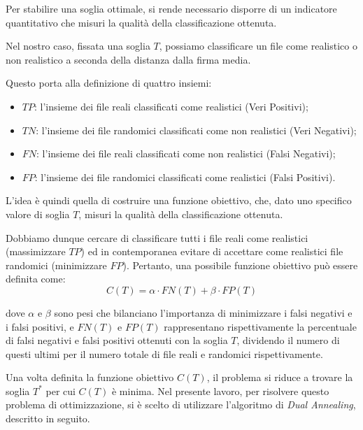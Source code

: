 \documentclass{report}
\begin{document}
\bigskip

Per stabilire una soglia ottimale, si rende necessario disporre di un indicatore quantitativo che misuri la qualità della classificazione ottenuta.

Nel nostro caso, fissata una soglia $T$, possiamo classificare un file come realistico o non realistico a seconda della distanza 
dalla firma media.

\bigskip

Questo porta alla definizione di quattro insiemi:
\begin{itemize}
    \item \(TP\): l’insieme dei file reali classificati come realistici (Veri Positivi);
    \item \(TN\): l’insieme dei file randomici classificati come non realistici (Veri Negativi);
    \item \(FN\): l’insieme dei file reali classificati come non realistici (Falsi Negativi);
    \item \(FP\): l’insieme dei file randomici classificati come realistici (Falsi Positivi).
\end{itemize}

\bigskip

L'idea è quindi quella di costruire una funzione obiettivo, che, dato uno specifico valore di soglia \(T\), misuri la qualità della classificazione ottenuta.

\bigskip

Dobbiamo dunque cercare di classificare tutti i file reali come realistici (massimizzare \(TP\)) ed in contemporanea evitare di accettare come realistici file randomici (minimizzare \(FP\)).
Pertanto, una possibile funzione obiettivo può essere definita come:
\[
C(T) = \alpha \cdot FN(T) + \beta \cdot FP(T)
\]

dove \(\alpha\) e \(\beta\) sono pesi che bilanciano l'importanza di minimizzare i falsi negativi e i falsi positivi,
e \(FN(T)\) e \(FP(T)\) rappresentano rispettivamente la percentuale di falsi negativi e falsi positivi ottenuti con la soglia \(T\), 
dividendo il numero di questi ultimi per il numero totale di file reali e randomici rispettivamente.

\bigskip

Una volta definita la funzione obiettivo \(C(T)\), il problema si riduce a trovare la soglia \(T^*\) per cui \(C(T)\) è minima.
Nel presente lavoro, per risolvere questo problema di ottimizzazione, si è scelto di utilizzare l'algoritmo di \emph{Dual Annealing}, descritto in seguito.
\end{document}

